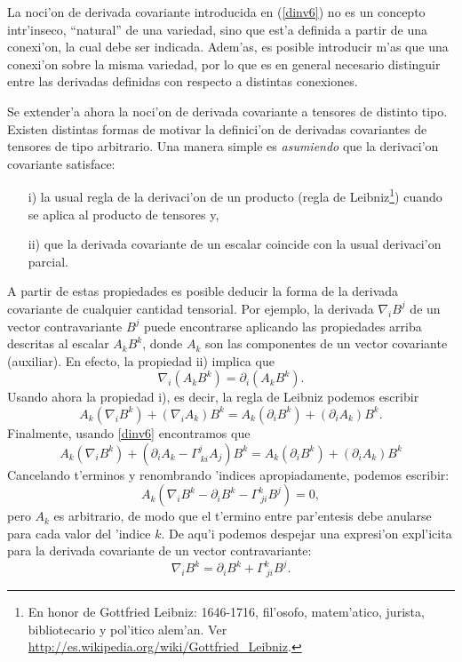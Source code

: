  La noci'on de derivada covariante introducida en (\ref{dinv6}) no es un concepto intr'inseco, ``natural'' de una variedad, sino que est'a definida a partir de una conexi'on, la cual debe ser indicada. Adem'as, es posible introducir m'as que una conexi'on sobre la misma variedad, por lo que es en general necesario distinguir entre las derivadas definidas con respecto a distintas conexiones.

Se extender'a ahora la noci'on de derivada covariante a tensores de distinto tipo. Existen distintas formas de motivar la definici'on de derivadas covariantes de tensores de tipo arbitrario. Una manera simple es  \textit{asumiendo} que la derivaci'on covariante satisface:
\begin{itemize}
\item[i)] la usual regla de la derivaci'on de un producto (regla de
Leibniz\footnote{En honor de Gottfried Leibniz: 1646-1716, fil'osofo, matem'atico, jurista, bibliotecario y pol'itico alem'an. Ver \url{http://es.wikipedia.org/wiki/Gottfried_Leibniz}.}) cuando se aplica al producto de tensores y,
\item[ii)] que la derivada covariante de un escalar coincide con la usual derivaci'on parcial.
\end{itemize}

A partir de estas propiedades es posible deducir la forma de la derivada covariante de cualquier cantidad tensorial. Por ejemplo, la derivada $\nabla_iB^j$ de un vector contravariante $B^j$ puede encontrarse aplicando las propiedades arriba descritas al escalar $A_k B^k $, donde $A_k$ son las componentes de un vector covariante (auxiliar). En efecto, la propiedad ii) implica que
\begin{equation}
\nabla_i\left( A_k B^k\right)=\partial_i\left( A_k B^k \right).\label{dinv12}
\end{equation}
Usando ahora la propiedad i), es decir, la regla de Leibniz podemos escribir
\begin{equation}
A_k (\nabla_iB^k)+(\nabla_i A_k)B^k = A_k (\partial_iB^k) +(\partial_iA_k)B^k .
\end{equation}
Finalmente, usando \eqref{dinv6} encontramos que
\begin{equation}
A_k (\nabla_iB^k) +\left(\partial_iA_k-\Gamma_{\ ki}^jA_j\right) B^k=A_k (\partial_iB^k) +(\partial_iA_k)B^k 
\end{equation}
Cancelando t'erminos y renombrando 'indices apropiadamente, podemos
escribir:
\begin{equation}
A_k \left( \nabla_iB^k -\partial_iB^k -\Gamma_{\ ji}^k B^j\right) =0,
\end{equation}
pero $A_k $ es arbitrario, de modo que el t'ermino entre par'entesis debe anularse para cada valor del 'indice $k$. De aqu'i podemos despejar una expresi'on expl'icita para la derivada covariante de un vector contravariante:
\begin{equation}
\boxed{\nabla_iB^k =\partial_iB^k +\Gamma_{\ ji}^kB^j .} \label{dinv15}
\end{equation}

